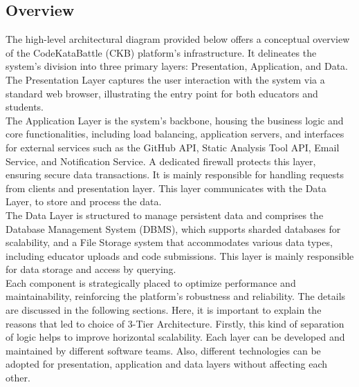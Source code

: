 \subsection{Overview}
\indent The high-level architectural diagram provided below offers a conceptual overview of the CodeKataBattle (CKB) platform's infrastructure. It delineates the system's division into three primary layers: Presentation, Application, and Data. 
\newline
\indent The Presentation Layer captures the user interaction with the system via a standard web browser, illustrating the entry point for both educators and students. \\
\indent The Application Layer is the system's backbone, housing the business logic and core functionalities, including load balancing, application servers, and interfaces for external services such as the GitHub API, Static Analysis Tool API, Email Service, and Notification Service. A dedicated firewall protects this layer, ensuring secure data transactions. It is mainly responsible for handling requests from clients and presentation layer. This layer communicates with the Data Layer, to store and process the data.\\
\indent The Data Layer is structured to manage persistent data and comprises the Database Management System (DBMS), which supports sharded databases for scalability, and a File Storage system that accommodates various data types, including educator uploads and code submissions. This layer is mainly  responsible for data storage and access by querying. \\
\indent Each component is strategically placed to optimize performance and maintainability, reinforcing the platform’s robustness and reliability. The details are discussed in the following sections.
\newline
\indent Here, it is important to explain the reasons that led to choice of 3-Tier Architecture. Firstly, this kind of separation of logic helps to improve horizontal scalability. Each layer can be developed and maintained by different software teams. Also, different technologies can be adopted for presentation, application and data layers without affecting each other. \\
